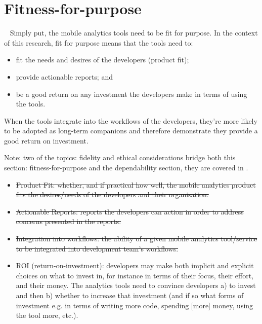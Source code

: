 \section{Fitness-for-purpose}~\label{tata-fitness-for-purpose-section}
Simply put, the mobile analytics tools need to be fit for purpose. In the context of this research, fit for purpose means that the tools need to:

\begin{itemize}
\item fit the needs and desires of the developers (product fit); 
\item provide actionable reports; and 
\item be a good return on any investment the developers make in terms of using the tools.
\end{itemize}
 
When the tools integrate into the workflows of the developers, they're more likely to be adopted as long-term companions and therefore demonstrate they provide a good return on investment. 

Note: two of the topics: fidelity and ethical considerations bridge both this section: fitness-for-purpose and the dependability section, they are covered in .

{\small
\begin{itemize}
    \itemsep0em
    \item \sout{Product Fit: whether, and if practical how well, the mobile analytics product fits the desires/needs of the developers and their organisation.}
    \item \sout{Actionable Reports: reports the developers can action in order to address concerns presented in the reports.}
    \item \sout{Integration into workflows: the ability of a given mobile analytics tool/service to be integrated into development team's workflows.}
    \item ROI (return-on-investment): developers may make both implicit and explicit choices on what to invest in, for instance in terms of their focus, their effort, and their money. The analytics tools need to convince developers a) to invest and then b) whether to increase that investment (and if so what forms of investment e.g. in terms of writing more code, spending [more] money, using the tool more, etc.).
\end{itemize}
}

